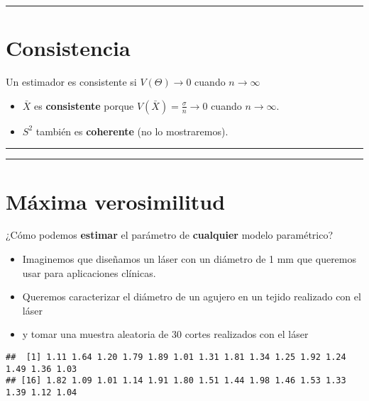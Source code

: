 \documentclass[
]{book}
\begin{document}
\begin{center}\rule{0.5\linewidth}{0.5pt}\end{center}

\hypertarget{consistencia}{%
\section{Consistencia}\label{consistencia}}

Un estimador es consistente si \(V(\Theta) \rightarrow 0\) cuando \(n \rightarrow \infty\)

\begin{itemize}
\item
  \(\bar{X}\) es \textbf{consistente} porque \(V(\bar{X})=\frac{\sigma}{n}\rightarrow 0\) cuando \(n \rightarrow \infty\).
\item
  \(S^2\) también es \textbf{coherente} (no lo mostraremos).
\end{itemize}

\begin{center}\rule{0.5\linewidth}{0.5pt}\end{center}

\begin{center}\rule{0.5\linewidth}{0.5pt}\end{center}

\hypertarget{muxe1xima-verosimilitud-1}{%
\section{Máxima verosimilitud}\label{muxe1xima-verosimilitud-1}}

¿Cómo podemos \textbf{estimar} el parámetro de \textbf{cualquier} modelo paramétrico?

\begin{itemize}
\item
  Imaginemos que diseñamos un láser con un diámetro de 1 mm que queremos usar para aplicaciones clínicas.
\item
  Queremos caracterizar el diámetro de un agujero en un tejido realizado con el láser
\item
  y tomar una muestra aleatoria de 30 cortes realizados con el láser
\end{itemize}

\begin{verbatim}
##  [1] 1.11 1.64 1.20 1.79 1.89 1.01 1.31 1.81 1.34 1.25 1.92 1.24 1.49 1.36 1.03
## [16] 1.82 1.09 1.01 1.14 1.91 1.80 1.51 1.44 1.98 1.46 1.53 1.33 1.39 1.12 1.04
\end{verbatim}
\end{document}
